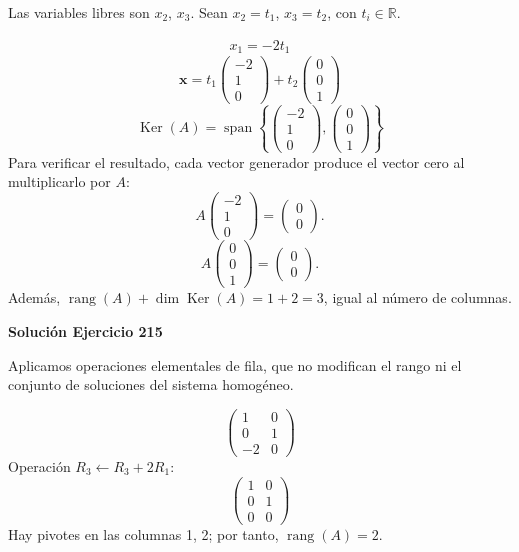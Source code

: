 \documentclass[12pt]{article}
\theoremstyle{remark}
\newcommand{\rang}{\operatorname{rang}}
\newcommand{\Ker}{\operatorname{Ker}}
\newcommand{\vect}[1]{\boldsymbol{#1}}
\begin{document}
Las variables libres son $x_{2}$, $x_{3}$. Sean $x_{2}=t_{1}$, $x_{3}=t_{2}$, con $t_i\in\mathbb R$.

\[
\begin{aligned}x_{1}=- 2 t_{1}\end{aligned}
\]
\[
\vect x=t_{1}\begin{pmatrix}-2\\1\\0\end{pmatrix} + t_{2}\begin{pmatrix}0\\0\\1\end{pmatrix}
\]
\[
\boxed{\Ker(A)=\operatorname{span}\left\{\begin{pmatrix}-2\\1\\0\end{pmatrix},\begin{pmatrix}0\\0\\1\end{pmatrix}\right\}}
\]
Para verificar el resultado, cada vector generador produce el vector cero al multiplicarlo por $A$:
\[
A\begin{pmatrix}-2\\1\\0\end{pmatrix}=\begin{pmatrix}0\\0\end{pmatrix}.
\]
\[
A\begin{pmatrix}0\\0\\1\end{pmatrix}=\begin{pmatrix}0\\0\end{pmatrix}.
\]
Además, $\rang(A)+\dim\Ker(A)=1+2=3$, igual al número de columnas.


\par\bigskip\noindent\textbf{Solución Ejercicio 215}\par\nobreak
Aplicamos operaciones elementales de fila, que no modifican el rango ni el conjunto de soluciones del sistema homogéneo.

\[
\begin{pmatrix}1&0\\0&1\\-2&0\end{pmatrix}
\]
Operación $R_{3}\leftarrow R_{3}+2R_{1}$:
\[
\begin{pmatrix}1&0\\0&1\\0&0\end{pmatrix}
\]
Hay pivotes en las columnas 1, 2; por tanto, $\boxed{\rang(A)=2}$.
\end{document}
